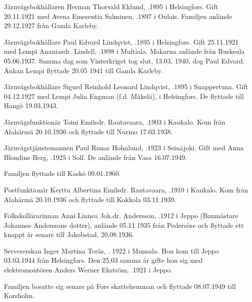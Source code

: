 Järnvägsbokhållaren Herman Thorvald Eklund, .1895 i Helsingfors. Gift 20.11.1921 med Avena Emesentia Salminen, .1897 i Oulais. Familjen anlände 29.12.1927 från Gamla Karleby.
\begin{jhchildren}
  \item {}
  \item {}
  \item {}
\end{jhchildren}


Järnvägsbokhållare Paul Edvard Lindqvist, .1895 i Helsingfors. Gift 25.11.1921 med Lempi Ananiasdr. Lindell, .1898 i Multiala. Makarna anlände från Ruskeala 05.06.1937. Samma dag som Vinterkriget tog slut, 13.03. 1940, dog Paul Edvard. Änkan Lempi flyttade 20.05 1941 till Gamla Karleby.


Järnvägsbokhållare Sigurd Reinhold Leonard Lindqvist, .1895 i Snappertuna. Gift 04.12.1927 med Lempi Julia Engman (f.d. Mäkelä),  i Helsingfors. De flyttade till Hangö 19.03.1943.


Järnvägsfunktionär Toini Emilsdr. Rautavaara, .1903 i Kaukalo. Kom från Alahärmä 20.10.1936 och flyttade till Nurmo 17.03.1938.


Järnvägstjänstemannen Paul Runar Holmlund, .1923 i Seinäjoki. Gift med Anna Blondine Berg, .1925 i Solf. De anlände från Vasa 16.07.1949.
\begin{jhchildren}
  \item {}
  \item {}
\end{jhchildren}
Familjen flyttade till Kaskö 09.01.1960.


Postfunktionär Kerttu Albertina Emilsdr. Rautavaara, .1910 i Kaukalo. Kom från Alahärmä 20.10.1936 och flyttade till Kokkola 03.11.1939.


Folkskollärarinnan Anni Linnea Joh.dr. Andersson, .1912 i Jeppo (Banmästare Johannes Anderssons dotter), anlände 05.11.1935 från Pedersöre och flyttade ett knappt år senare till Jakobstad, 20.08.1936.


Servererskan Inger Martina Teräs, . 1922 i Munsala. Hon kom till Jeppo 03.03.1944 från Helsingfors. Den 25.03 samma år gifte hon sig med elektromontören Anders Werner Ekström, .1921 i Jeppo.
\begin{jhchildren}
  \item {}
  \item {}
\end{jhchildren}
Familjen bosatte sig senare på Fors skattehemman och flyttade 08.07.1949 till Korsholm.



